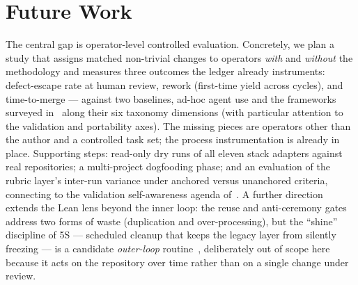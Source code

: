\documentclass[11pt]{article}
\begin{document}
\section{Future Work}\label{sec:future}

The central gap is operator-level controlled evaluation. Concretely, we plan a study that
assigns matched non-trivial changes to operators \emph{with} and \emph{without}
the methodology and measures three outcomes the ledger already instruments:
defect-escape rate at human review, rework (first-time yield across cycles),
and time-to-merge --- against two baselines, ad-hoc agent use and the
frameworks surveyed in~\cite{demacedo2026prompt} along their six taxonomy
dimensions (with particular attention to the validation and portability axes).
The missing pieces are operators other than the author and a controlled task
set; the process instrumentation is already in place. Supporting steps:
read-only dry runs of all eleven stack adapters against real repositories; a
multi-project dogfooding phase; and an evaluation of the rubric layer's
inter-run variance under anchored versus unanchored criteria, connecting to the
validation self-awareness agenda of~\cite{ma2026building}. A further direction extends the Lean lens beyond the
inner loop: the reuse and anti-ceremony gates address two forms of waste
(duplication and over-processing), but the ``shine'' discipline of 5S ---
scheduled cleanup that keeps the legacy layer from silently freezing --- is a
candidate \emph{outer-loop} routine~\cite{poppendieck2006lean}, deliberately
out of scope here because it acts on the repository over time rather than on a
single change under review.
\end{document}
